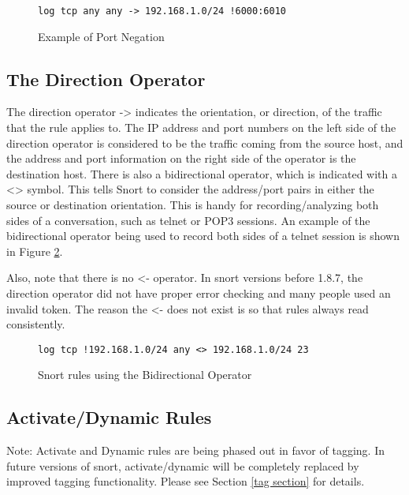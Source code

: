 \documentclass[english]{report}
\begin{document}
%
\begin{figure}[!hbpt]
\begin{verbatim}
log tcp any any -> 192.168.1.0/24 !6000:6010
\end{verbatim}

\caption{\label{example port negation}Example of Port Negation}
\end{figure}



\subsection{The Direction Operator}

The direction operator -> indicates the orientation,
or direction, of the traffic that the rule applies
to. The IP address and port numbers on the left side of the direction
operator is considered to be the traffic coming from the source host,
and the address and port information on the right side of the operator
is the destination host. There is also a bidirectional operator, which
is indicated with a <> symbol. This tells Snort
to consider the address/port pairs in either the source or destination
orientation. This is handy for recording/analyzing both sides of a
conversation, such as telnet or POP3 sessions. An example of the bidirectional
operator being used to record both sides of a telnet session is shown
in Figure \ref{bidirectional operator}.

Also, note that there is no <- operator. In snort
versions before 1.8.7, the direction operator did not have proper
error checking and many people used an invalid token. The reason the
<- does not exist is so that rules always read
consistently.

%
\begin{figure}[!hbpt]
\begin{verbatim}
log tcp !192.168.1.0/24 any <> 192.168.1.0/24 23
\end{verbatim}

\caption{\label{bidirectional operator}Snort rules using the Bidirectional
Operator}
\end{figure}



\subsection{Activate/Dynamic Rules}

Note: Activate and Dynamic rules are being phased out in favor of
tagging. In future versions of snort, activate/dynamic will be completely
replaced by improved tagging functionality. Please see Section \ref{tag section}
for details.
\end{document}
